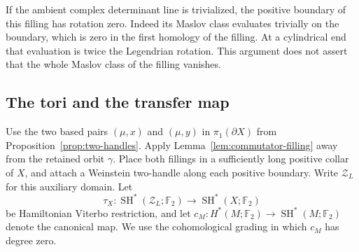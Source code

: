 \documentclass[11pt]{amsart}
\theoremstyle{definition}
\theoremstyle{remark}
\newcommand{\Ftwo}{\mathbb F_2}
\begin{document}
If the ambient complex determinant line is trivialized, the
positive boundary of this filling has rotation zero. Indeed its
Maslov class evaluates trivially on the boundary, which is zero
in the first homology of the filling. At a cylindrical end that
evaluation is twice the Legendrian rotation. This argument does
not assert that the whole Maslov class of the filling vanishes.

\subsection{The tori and the transfer map}

Use the two based pairs $(\mu,x)$ and $(\mu,y)$ in
$\pi_1(\partial X)$ from Proposition~\ref{prop:two-handles}.
Apply Lemma~\ref{lem:commutator-filling} away from the retained
orbit $\gamma$. Place both fillings in a sufficiently long
positive collar of $X$, and attach a Weinstein two-handle along
each positive boundary. Write $\mathcal Z_L$ for this auxiliary
domain. Let
\[
 \tau_X:\operatorname{SH}^*(\mathcal Z_L;\Ftwo)
                  \longrightarrow\operatorname{SH}^*(X;\Ftwo)
\]
be Hamiltonian Viterbo restriction, and let
$c_M:H^*(M;\Ftwo)\to\operatorname{SH}^*(M;\Ftwo)$ denote the
canonical map. We use the cohomological grading in which $c_M$
has degree zero.
\end{document}
